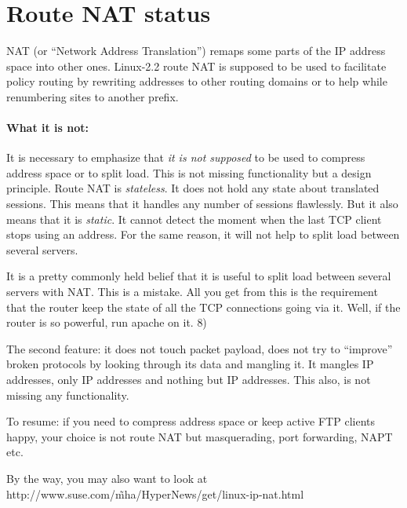 \section{Route NAT status}
\label{ROUTE-NAT}

NAT (or ``Network Address Translation'') remaps some parts
of the IP address space into other ones. Linux-2.2 route NAT is supposed
to be used to facilitate policy routing by rewriting addresses
to other routing domains or to help while renumbering sites
to another prefix.

\paragraph{What it is not:}
It is necessary to emphasize that {\em it is not supposed\/}
to be used to compress address space or to split load.
This is not missing functionality but a design principle.
Route NAT is {\em stateless\/}. It does not hold any state
about translated sessions. This means that it handles any number
of sessions flawlessly. But it also means that it is {\em static\/}.
It cannot detect the moment when the last TCP client stops
using an address. For the same reason, it will not help to split
load between several servers.
\begin{NB}
It is a pretty commonly held belief that it is useful to split load between
several servers with NAT. This is a mistake. All you get from this
is the requirement that the router keep the state of all the TCP connections
going via it. Well, if the router is so powerful, run apache on it. 8)
\end{NB}

The second feature: it does not touch packet payload,
does not try to ``improve'' broken protocols by looking
through its data and mangling it. It mangles IP addresses,
only IP addresses and nothing but IP addresses.
This also, is not missing any functionality.

To resume: if you need to compress address space or keep
active FTP clients happy, your choice is not route NAT but masquerading,
port forwarding, NAPT etc. 
\begin{NB}
By the way, you may also want to look at
http://www.suse.com/\~mha/HyperNews/get/linux-ip-nat.html
\end{NB}


